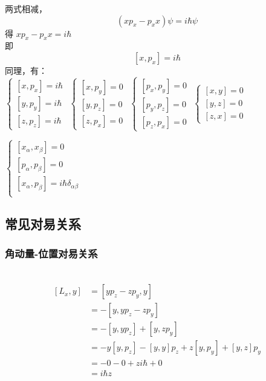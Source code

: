 \begin{frame}
    两式相减，$$(xp_x-p_x x)\psi= i\hbar\psi$$
    得 $xp_x-p_x x= i\hbar$ \\ \vspace{0.3em}
    即 $$\boxed{[x,p_x]= i\hbar}$$
    同理，有：\\
    $\begin{cases}
        [x,p_x]= i\hbar  \\ 
        [y,p_y]= i\hbar  \\ 
        [z,p_z]= i\hbar  
    \end{cases}$
    $\begin{cases}
        [x,p_y]= 0  \\ 
        [y,p_z]= 0  \\ 
        [z,p_x]= 0  
    \end{cases}$
    $\begin{cases}
        [p_x,p_y]= 0  \\ 
        [p_y,p_z]= 0  \\ 
        [p_z,p_x]= 0  
    \end{cases}$
    $\begin{cases}
        [x,y]= 0  \\ 
        [y,z]= 0  \\ 
        [z,x]= 0  
    \end{cases}$ \\
\end{frame} 

\begin{frame}  
    \begin{tcolorbox4}[量子力学基本对易关系]
    $\begin{cases}
        [x_\alpha,x_\beta]= 0  \\ 
        [p_\alpha,p_\beta]= 0  \\ 
        [x_\alpha,p_\beta]= i\hbar \delta_{\alpha\beta}  \\ 
    \end{cases}$
    \end{tcolorbox4}
\end{frame} 

\subsection{常见对易关系}

\begin{frame}
    \frametitle{角动量-位置对易关系}
    \证~ 
    \begin{equation*}
        \begin{split}
        [L_x,y]&= [yp_z-zp_y,y]\\
        &=-[y,yp_z-zp_y]\\
        &= -[y,yp_z] + [y,zp_y]\\
        &=-y[y,p_z] -[y,y]p_z + z[y,p_y] + [y,z]p_y\\
        &=-0 -0 + z i\hbar + 0\\
        &=i\hbar z \\
        \end{split}  
    \end{equation*}
\end{frame} 

